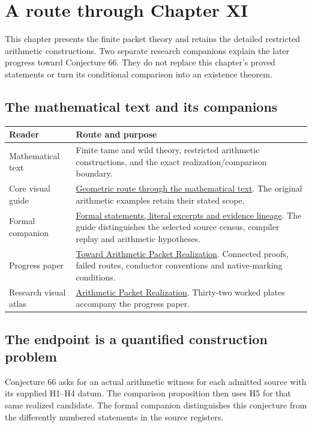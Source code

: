 \begingroup\raggedright
\section*{A route through Chapter XI}
{}
This chapter presents the finite packet theory and retains the detailed restricted arithmetic constructions. Two separate research companions explain the later progress toward Conjecture 66. They do not replace this chapter's proved statements or turn its conditional comparison into an existence theorem.

\subsection*{The mathematical text and its companions}
\begin{tabular}{@{}>{\raggedright\arraybackslash}p{.28\linewidth}>{\raggedright\arraybackslash}p{.67\linewidth}@{}}\toprule
Reader & Route and purpose\\\midrule
Mathematical text & Finite tame and wild theory, restricted arithmetic constructions, and the exact realization/comparison boundary.\\[7pt]
Core visual guide & \href{https://komorebi.invalid/b07/core_visual}{Geometric route through the mathematical text}. The original arithmetic examples retain their stated scope.\\[7pt]
Formal companion & \href{https://komorebi.invalid/b07/core_lean}{Formal statements, literal excerpts and evidence lineage}. The guide distinguishes the selected source census, compiler replay and arithmetic hypotheses.\\[7pt]
Progress paper & \href{https://komorebi.invalid/b07/research_start}{Toward Arithmetic Packet Realization}. Connected proofs, failed routes, conductor conventions and native-marking conditions.\\[7pt]
Research visual atlas & \href{https://komorebi.invalid/b07/atlas_start}{Arithmetic Packet Realization}. Thirty-two worked plates accompany the progress paper.\\\bottomrule
\end{tabular}

\subsection*{The endpoint is a quantified construction problem}
Conjecture 66 asks for an actual arithmetic witness for each admitted source with its supplied H1--H4 datum. The comparison proposition then uses H5 for that same realized candidate. The formal companion distinguishes this conjecture from the differently numbered statements in the source registers.

